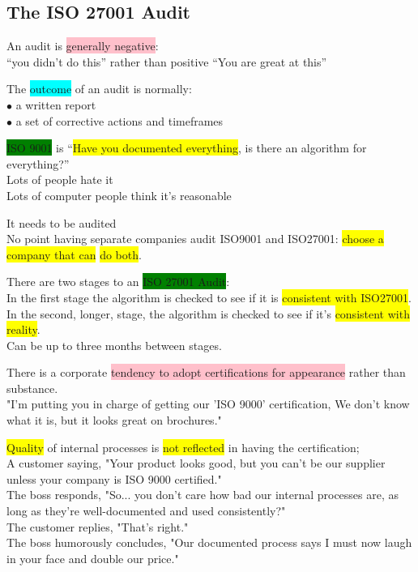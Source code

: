 \documentclass[tikz,border=10pt]{project_plan}
\newcommand{\bulletPoint}{\hspace{-3.1pt}$\bullet$ \hspace{5pt}}
\begin{document}
\subsection{The ISO 27001 Audit}

An audit is \colorbox{pink}{generally negative}:\\
“you didn’t do this” rather than positive “You are great at this”

The \colorbox{cyan}{outcome} of an audit is normally:\\
\bulletPoint a written report\\
\bulletPoint a set of corrective actions and timeframes

\colorbox{green}{ISO 9001} is “\colorbox{yellow}{Have you documented everything}, is there an algorithm for everything?”\\
Lots of people hate it\\
Lots of computer people think it’s reasonable

It needs to be audited \\
No point having separate companies audit ISO9001 and ISO27001: \colorbox{yellow}{choose a company that can} \colorbox{yellow}{do both}.

There are two stages to an \colorbox{green}{ISO 27001 Audit}: \\
In the first stage the algorithm is checked to see if it is \colorbox{yellow}{consistent with ISO27001}. \\
In the second, longer, stage, the algorithm is checked to see if it’s \colorbox{yellow}{consistent with reality}. \\
Can be up to three months between stages.

There is a corporate \colorbox{pink}{tendency to adopt certifications for appearance} rather than substance.\\
"I'm putting you in charge of getting our 'ISO 9000' certification, We don't know what it is, but it looks great on brochures."

\colorbox{yellow}{Quality} of internal processes is \colorbox{yellow}{not reflected} in having the certification;\\
A customer saying, "Your product looks good, but you can't be our supplier unless your company is ISO 9000 certified."\\
The boss responds, "So... you don't care how bad our internal processes are, as long as they're well-documented and used consistently?"\\
The customer replies, "That's right."\\
The boss humorously concludes, "Our documented process says I must now laugh in your face and double our price."
\end{document}
